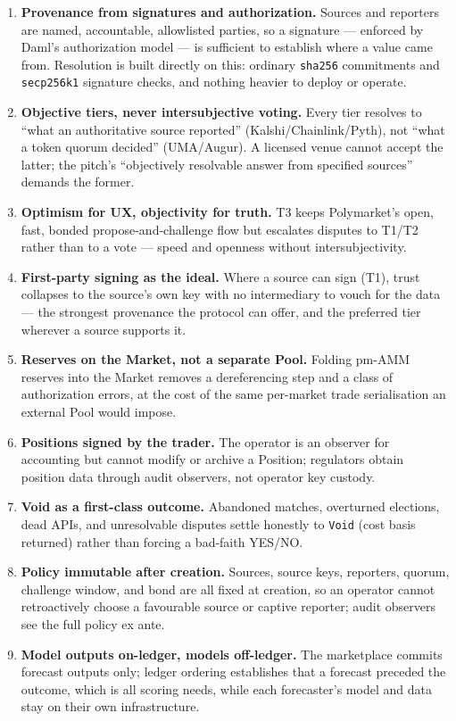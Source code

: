 \documentclass[11pt,a4paper]{article}
\begin{document}
\begin{enumerate}[leftmargin=2em, itemsep=3pt]
\item \textbf{Provenance from signatures and authorization.} Sources and reporters are named, accountable, allowlisted parties, so a signature --- enforced by Daml's authorization model --- is sufficient to establish where a value came from. Resolution is built directly on this: ordinary \texttt{sha256} commitments and \texttt{secp256k1} signature checks, and nothing heavier to deploy or operate.
\item \textbf{Objective tiers, never intersubjective voting.} Every tier resolves to ``what an authoritative source reported'' (Kalshi/Chainlink/Pyth), not ``what a token quorum decided'' (UMA/Augur). A licensed venue cannot accept the latter; the pitch's ``objectively resolvable answer from specified sources'' demands the former.
\item \textbf{Optimism for UX, objectivity for truth.} T3 keeps Polymarket's open, fast, bonded propose-and-challenge flow but escalates disputes to T1/T2 rather than to a vote --- speed and openness without intersubjectivity.
\item \textbf{First-party signing as the ideal.} Where a source can sign (T1), trust collapses to the source's own key with no intermediary to vouch for the data --- the strongest provenance the protocol can offer, and the preferred tier wherever a source supports it.
\item \textbf{Reserves on the Market, not a separate Pool.} Folding pm-AMM reserves into the Market removes a dereferencing step and a class of authorization errors, at the cost of the same per-market trade serialisation an external Pool would impose.
\item \textbf{Positions signed by the trader.} The operator is an observer for accounting but cannot modify or archive a Position; regulators obtain position data through audit observers, not operator key custody.
\item \textbf{Void as a first-class outcome.} Abandoned matches, overturned elections, dead APIs, and unresolvable disputes settle honestly to \texttt{Void} (cost basis returned) rather than forcing a bad-faith YES/NO.
\item \textbf{Policy immutable after creation.} Sources, source keys, reporters, quorum, challenge window, and bond are all fixed at creation, so an operator cannot retroactively choose a favourable source or captive reporter; audit observers see the full policy ex ante.
\item \textbf{Model outputs on-ledger, models off-ledger.} The marketplace commits forecast outputs only; ledger ordering establishes that a forecast preceded the outcome, which is all scoring needs, while each forecaster's model and data stay on their own infrastructure.
\end{enumerate}
\end{document}
